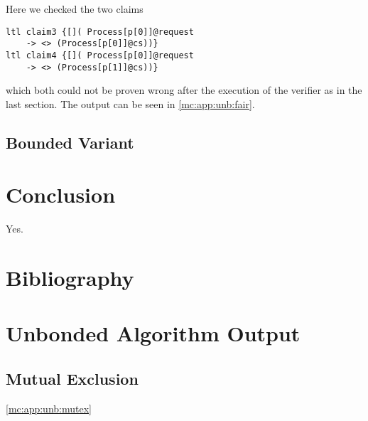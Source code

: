\documentclass{llncs}
\begin{document}
Here we checked the two claims

\begin{lstlisting}
ltl claim3 {[]( Process[p[0]]@request 
    -> <> (Process[p[0]]@cs))}
ltl claim4 {[]( Process[p[0]]@request 
    -> <> (Process[p[1]]@cs))}
\end{lstlisting}

which both could not be proven wrong after the execution of the verifier as in the last section.
The output can be seen in \ref{mc:app:unb:fair}.

\subsection{Bounded Variant}

\section{Conclusion}

Yes.

\section{Bibliography}




\appendix

\section{Unbonded Algorithm Output}

\subsection{Mutual Exclusion}
\ref{mc:app:unb:mutex}
\end{document}
